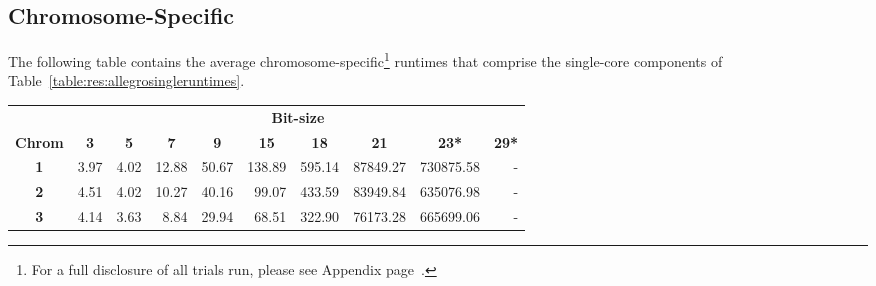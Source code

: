 \subsection{Chromosome-Specific}

The following table contains the average chromosome-specific\footnote{For a full disclosure of all trials run, please see Appendix page~\pageref{ref:app:singlecoreindiv}.} runtimes that comprise the single-core components of Table~\ref{table:res:allegrosingleruntimes}.

\begin{table}[h]
\begin{center}
\begin{tabular}{crrrrrrrrr}\toprule
\multicolumn{1}{l}{}               & \multicolumn{9}{c}{\textbf{Bit-size}}                                                                                                                                                                                                                                                                         \\
\multicolumn{1}{l}{\textbf{Chrom}} & \multicolumn{1}{c}{\textbf{3}} & \multicolumn{1}{c}{\textbf{5}} & \multicolumn{1}{c}{\textbf{7}} & \multicolumn{1}{c}{\textbf{9}} & \multicolumn{1}{c}{\textbf{15}} & \multicolumn{1}{c}{\textbf{18}} & \multicolumn{1}{c}{\textbf{21}} & \multicolumn{1}{c}{\textbf{23*}} & \multicolumn{1}{c}{\textbf{29*}} \\
\midrule
\textbf{1}                         & 3.97                           & 4.02                           & 12.88                          & 50.67                          & 138.89                          & 595.14                          & 87849.27                        & 730875.58                        & -                                \\
\textbf{2}                         & 4.51                           & 4.02                           & 10.27                      & 40.16                          & 99.07                           & 433.59                          & 83949.84                        & 635076.98                        & -                                \\
\textbf{3}                         & 4.14                           & 3.63                          & 8.84                       & 29.94                          & 68.51                           & 322.90                          & 76173.28                        & 665699.06                        & -                                \\

\end{tabular}
\end{center}
\end{table}
